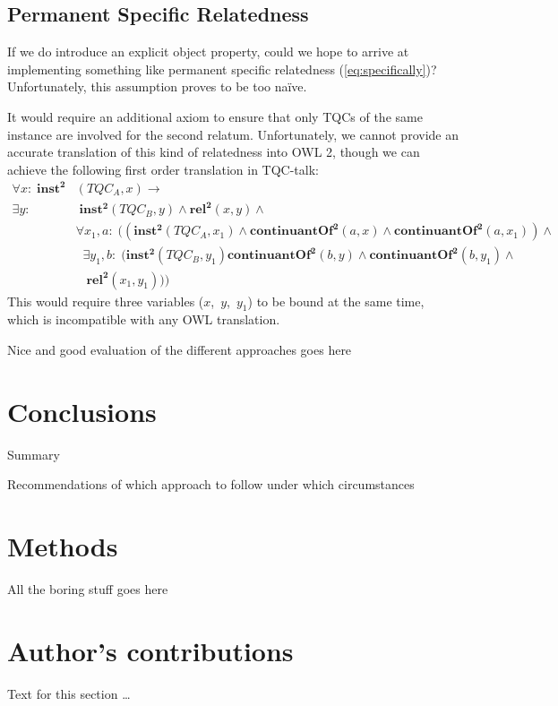 \documentclass[10pt]{bmc_article}
\newcommand{\mirel}[1]{\ensuremath{\mathrm{\mathbf{#1}}}}
\newcommand{\mclass}[1]{\ensuremath{\mathit{#1}}}
\newcommand{\mrel}[2]{\mirel{#1^#2}}
\newcommand{\mrelb}[1]{\mrel{#1}{2}}
\newcommand{\TQC}[1]{\ensuremath{TQC_{\mclass{#1}}}}
\newenvironment{bmcformat}{\baselineskip20pt\sloppy\setboolean{publ}{false}}{\baselineskip20pt\sloppy}
\begin{document}
\begin{bmcformat}
\subsection*{Permanent Specific Relatedness}
If we do introduce an explicit object property, could we hope to arrive at
implementing something like permanent specific relatedness
(\ref{eq:specifically})? Unfortunately, this assumption proves to be too na\"ive.

It would require an additional axiom to ensure that only TQCs of the same instance are involved
for the second relatum. Unfortunately, we cannot provide an
accurate translation of this kind of relatedness into OWL 2, though we can
achieve the following first order translation in TQC-talk:
 \begin{equation}
\begin{split}
\forall x:\; \mrelb{inst}&(\TQC{A},x) \rightarrow \\
 \exists y:&\;\mrelb{inst}(\TQC{B},y) \wedge \mrelb{rel}(x,y)\wedge\\
 & \forall x_1,a:\; ((\mrelb{inst}(\TQC{A},x_1) \wedge 
\mrelb{continuantOf}(a,x) \wedge \mrelb{continuantOf}(a,x_1))\wedge\\
&\;\;\exists y_1,b:\;(\mrelb{inst}(\TQC{B},y_1) \mrelb{continuantOf}(b,y)  
\wedge \mrelb{continuantOf}(b,y_1) \wedge\\&\;\;\;\mrelb{rel}(x_1,y_1)))
\end{split}
\end{equation}
This would require three variables ($x$,~$y$,~$y_1$) to be bound at the same
time, which is incompatible with any OWL translation.


Nice and good evaluation of the different approaches goes here

\section*{Conclusions}

Summary

Recommendations of which approach to follow under which circumstances


\section*{Methods}

All the boring stuff goes here

\bigskip

\section*{Author's contributions}
    Text for this section \ldots


\end{bmcformat}
\end{document}
